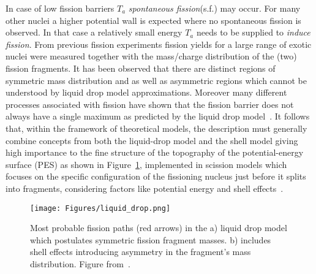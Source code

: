 In case of low fission barriers $T_a$ \textit{spontaneous fission}(s.f.) may occur. For many other nuclei a higher potential wall is expected  where no spontaneous fission is observed. In that case a relatively small energy $T_a$ needs to be supplied to \textit{induce fission}.
From previous fission experiments fission yields for a large range of exotic nuclei were measured together with the mass/charge distribution of the (two) fission fragments. It has been observed that there are distinct regions of symmetric mass distribution and as well as asymmetric regions which cannot be understood by liquid drop model approximations. Moreover many different processes associated with fission have shown that the fission barrier does not always have a single maximum as predicted by the liquid drop model~\cite{bassani2005encyclopedia}. It follows that, within the framework of theoretical models, the description must generally combine concepts from both the liquid-drop model and the shell model giving high importance to the fine structure of the topography of the potential-energy surface (PES) as shown in Figure~\ref{fig:drop_shell_model}, implemented in scission models which focuses on the specific configuration of the fissioning nucleus just before it splits into fragments, considering factors like potential energy and shell effects~\cite{pacsca2016possible,andreev2012mass,moller2012calculated}.\newline

\begin{figure}[htpb]
    \centering
    \texttt{[image: Figures/liquid\_drop.png]}
    \caption{
    Most probable fission paths (red arrows) in the a) liquid drop model which postulates symmetric fission fragment masses. b) includes shell effects introducing asymmetry in the fragment's mass distribution. Figure from~\cite{popescu2021review}. 
    }
    \label{fig:drop_shell_model}
\end{figure}

